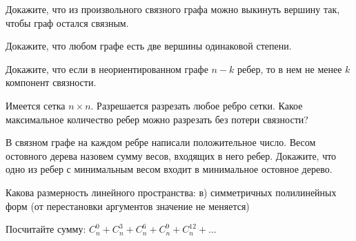 \setcounter{curtask}{24}



\begin{task}
    Докажите, что из произвольного связного графа можно выкинуть вершину так, чтобы
    граф остался связным.
\end{task}

\begin{task}
    Докажите, что любом графе есть две вершины одинаковой степени.
\end{task}

\begin{task}
    Докажите, что если в неориентированном графе $n - k$ ребер, то в нем не менее $k$
    компонент связности.
\end{task}

\begin{task}
    Имеется сетка $n \times n$. Разрешается разрезать любое ребро сетки. Какое
    максимальное количество ребер можно разрезать без потери связности?
\end{task}

\begin{task}
    В связном графе на каждом ребре написали положительное число. Весом остовного
    дерева назовем сумму весов, входящих в него ребер. Докажите, что одно из
    ребер с минимальным весом входит в минимальное остовное дерево.
\end{task}

\breakline

\begin{ptask}{17}
    Какова размерность линейного пространства:
	в) симметричных полилинейных форм (от перестановки аргументов значение не
    	меняется)
\end{ptask}

\begin{ptask}{18}
    Посчитайте сумму:
    $C_{n}^{0} + C_{n}^{3} + C_{n}^{6} + C_{n}^{9} + C_{n}^{12} + \dots$
\end{ptask}